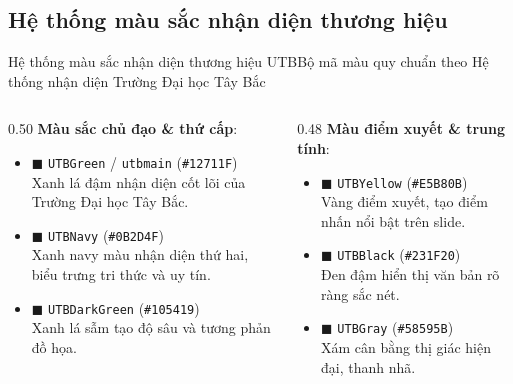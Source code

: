 \documentclass[aspectratio=43,10pt]{beamer}
\begin{document}
\subsection{Hệ thống màu sắc nhận diện thương hiệu}
\begin{frame}{Hệ thống màu sắc nhận diện thương hiệu UTB}{Bộ mã màu quy chuẩn theo Hệ thống nhận diện Trường Đại học Tây Bắc}
  \begin{columns}[T]
    \begin{column}{0.50\textwidth}
      \textbf{Màu sắc chủ đạo \& thứ cấp}:
      \begin{itemize}\setlength{\itemsep}{3pt}
        \item \textcolor{UTBGreen}{$\blacksquare$ \texttt{UTBGreen} / \texttt{utbmain}} (\texttt{\#12711F})\\
          \scriptsize Xanh lá đậm nhận diện cốt lõi của Trường Đại học Tây Bắc.
        \item \textcolor{UTBNavy}{$\blacksquare$ \texttt{UTBNavy}} (\texttt{\#0B2D4F})\\
          \scriptsize Xanh navy màu nhận diện thứ hai, biểu trưng tri thức và uy tín.
        \item \textcolor{UTBDarkGreen}{$\blacksquare$ \texttt{UTBDarkGreen}} (\texttt{\#105419})\\
          \scriptsize Xanh lá sẫm tạo độ sâu và tương phản đồ họa.
      \end{itemize}
    \end{column}

    \begin{column}{0.48\textwidth}
      \textbf{Màu điểm xuyết \& trung tính}:
      \begin{itemize}\setlength{\itemsep}{3pt}
        \item \textcolor{UTBYellow}{$\blacksquare$ \texttt{UTBYellow}} (\texttt{\#E5B80B})\\
          \scriptsize Vàng điểm xuyết, tạo điểm nhấn nổi bật trên slide.
        \item \textcolor{UTBBlack}{$\blacksquare$ \texttt{UTBBlack}} (\texttt{\#231F20})\\
          \scriptsize Đen đậm hiển thị văn bản rõ ràng sắc nét.
        \item \textcolor{UTBGray}{$\blacksquare$ \texttt{UTBGray}} (\texttt{\#58595B})\\
          \scriptsize Xám cân bằng thị giác hiện đại, thanh nhã.
      \end{itemize}
    \end{column}
  \end{columns}
\end{frame}
\end{document}
